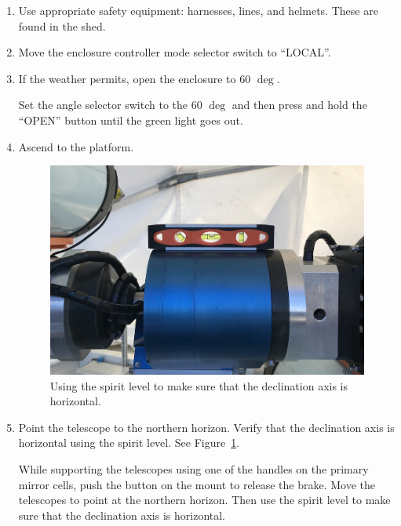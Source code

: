 \begin{enumerate}
\item
Use appropriate safety equipment: harnesses, lines, and helmets. These are found in the shed.

\item
Move the enclosure controller mode selector switch to “LOCAL”.

\item If the weather permits, open the enclosure to 60 $\deg$.

Set the angle selector switch to the 60 $\deg$ and then press and hold the “OPEN” button until the green light goes out.

\item Ascend to the platform.

\begin{figure}
\begin{center}
\includegraphics[width=0.7\linewidth]{figures/instrument-ddoti-mount-level.jpg}
\end{center}
\caption{Using the spirit level to make sure that the declination axis is horizontal.}
\label{figure:instrument-ddoti-mount-level}
\end{figure}

\item Point the telescope to the northern horizon. Verify that the declination axis is horizontal using the spirit level. See Figure~\ref{figure:instrument-ddoti-mount-level}.

While supporting the telescopes using one of the handles on the primary mirror cells, push the button on the mount to release the brake. Move the telescopes to point at the northern horizon. Then use the spirit level to make sure that the declination axis is horizontal.


\end{enumerate}
